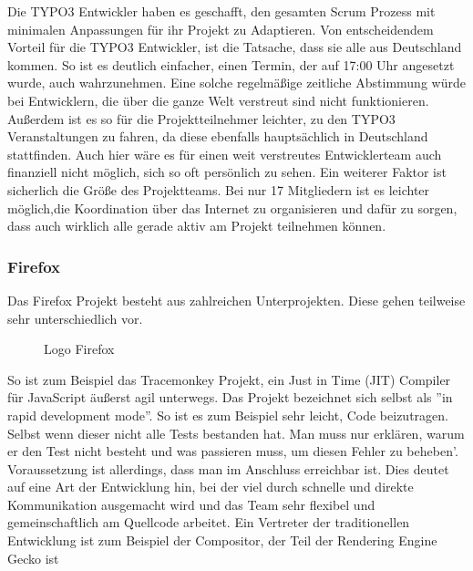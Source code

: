Die TYPO3 Entwickler haben es geschafft, den gesamten Scrum Prozess mit minimalen Anpassungen
für ihr Projekt zu Adaptieren. Von entscheidendem Vorteil für die TYPO3 Entwickler, ist die
Tatsache, dass sie alle aus Deutschland kommen. So ist es deutlich einfacher, einen Termin, der auf
17:00 Uhr angesetzt wurde, auch wahrzunehmen. Eine solche regelmäßige zeitliche Abstimmung würde bei
Entwicklern, die über die ganze Welt verstreut sind nicht funktionieren. Außerdem ist es so für die
Projektteilnehmer leichter, zu den TYPO3 Veranstaltungen zu fahren, da diese ebenfalls hauptsächlich
in Deutschland stattfinden. Auch hier wäre es für einen weit verstreutes Entwicklerteam
auch finanziell nicht möglich, sich so oft persönlich zu sehen. Ein weiterer Faktor ist sicherlich
die Größe des Projektteams. Bei nur 17 Mitgliedern ist es leichter möglich,die Koordination über das Internet zu  organisieren und dafür zu sorgen, dass auch wirklich alle gerade aktiv am Projekt teilnehmen können.

\subsubsection{Firefox}
Das Firefox Projekt besteht aus zahlreichen Unterprojekten. Diese gehen teilweise sehr unterschiedlich vor.
\begin{figure}[h]
	\centering
	\caption{Logo Firefox}
	\label{fireLogo}
\end{figure}
So ist zum Beispiel das Tracemonkey Projekt, ein Just in Time (JIT) Compiler für JavaScript äußerst agil unterwegs. Das Projekt bezeichnet sich selbst als ''in rapid development mode''\cite{bib:trm}. So ist es zum Beispiel sehr leicht, Code beizutragen. Selbst wenn dieser nicht alle Tests bestanden hat. Man muss nur erklären, warum er den Test nicht besteht und was passieren muss, um diesen Fehler zu beheben'\cite{bib:trm}. Voraussetzung ist allerdings, dass man im Anschluss erreichbar ist. Dies deutet auf eine Art der Entwicklung hin,  bei der viel durch schnelle und direkte Kommunikation ausgemacht wird und das Team sehr flexibel und gemeinschaftlich am Quellcode arbeitet.  Ein Vertreter der traditionellen Entwicklung ist zum Beispiel der Compositor, der  Teil der Rendering Engine Gecko ist \cite{bib:beltzner}

